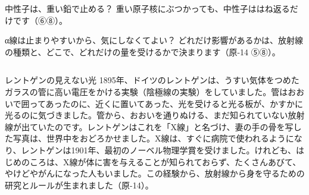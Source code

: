 \begin{tsumazuki}{中性子は、重い鉛で止める？}
重い原子核にぶつかっても、中性子ははね返るだけです（⑥⑧）。
\end{tsumazuki}

\begin{tsumazuki}{α線は止まりやすいから、気にしなくてよい？}
どれだけ影響があるかは、放射線の種類と、どこで、どれだけの量を受けるかで決まります（原-14 ⑤⑧）。
\end{tsumazuki}

\begin{column}{レントゲンの見えない光}
1895年、ドイツのレントゲンは、うすい気体をつめたガラスの管に高い電圧をかける実験（陰極線の実験）をしていました。管はおおいで囲ってあったのに、近くに置いてあった、光を受けると光る板が、かすかに光るのに気づきました。管から、おおいを通りぬける、まだ知られていない放射線が出ていたのです。レントゲンはこれを「X線」と名づけ、妻の手の骨を写した写真は、世界中をおどろかせました。X線は、すぐに病院で使われるようになり、レントゲンは1901年、最初のノーベル物理学賞を受けました。けれども、はじめのころは、X線が体に害を与えることが知られておらず、たくさんあびて、やけどやがんになった人もいました。この経験から、放射線から身を守るための研究とルールが生まれました（原-14）。
\end{column}

